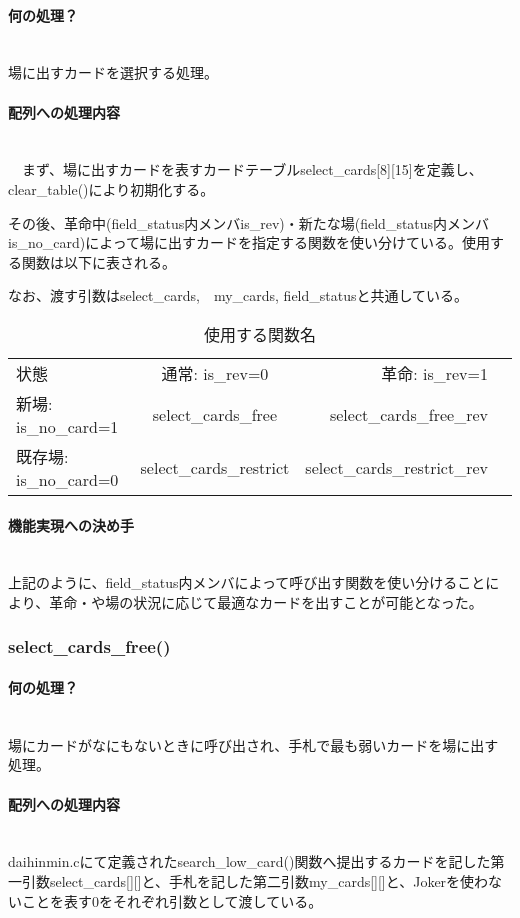 \documentclass[11pt,a4paper, uplatex]{jsarticle}
\begin{document}
\paragraph{何の処理？}\mbox{}\\
場に出すカードを選択する処理。
\paragraph{配列への処理内容}\mbox{}\\
　まず、場に出すカードを表すカードテーブルselect\_cards[8][15]を定義し、clear\_table()により初期化する。

その後、革命中(field\_status内メンバis\_rev)・新たな場(field\_status内メンバis\_no\_card)によって場に出すカードを指定する関数を使い分けている。使用する関数は以下に表される。

なお、渡す引数はselect_cards,　my_cards, field_statusと共通している。
\begin{table}[hbtp]
  \caption{使用する関数名}
  \centering
  \begin{tabular}{lcrr}
    状態 & 通常: is\_rev=0 & 革命: is\_rev=1\\
    新場: is\_no\_card=1  & select_cards\_free & select\_cards\_free\_rev \\
    既存場: is\_no\_card=0  & select\_cards\_restrict & select\_cards\_restrict\_rev \\
  \end{tabular}
\end{table}
\paragraph{機能実現への決め手}\mbox{}\\
上記のように、field\_status内メンバによって呼び出す関数を使い分けることにより、革命・や場の状況に応じて最適なカードを出すことが可能となった。
%
\subsubsection{select\_cards\_free()}
\paragraph{何の処理？}\mbox{}\\
場にカードがなにもないときに呼び出され、手札で最も弱いカードを場に出す処理。
\paragraph{配列への処理内容}\mbox{}\\
daihinmin.cにて定義されたsearch\_low\_card()関数へ提出するカードを記した第一引数select\_cards[][]と、手札を記した第二引数my\_cards[][]と、Jokerを使わないことを表す0をそれぞれ引数として渡している。
\end{document}
